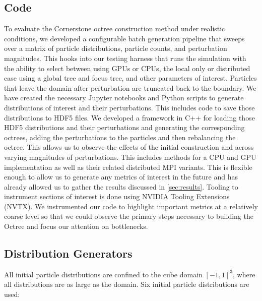\subsection{Code}
To evaluate the Cornerstone octree construction method under realistic conditions, we developed a configurable batch generation pipeline that sweeps over a matrix of particle distributions, particle counts, and perturbation magnitudes. This hooks into our testing harness that runs the simulation with the ability to select between using GPUs or CPUs, the local only or distributed case using a global tree and focus tree, and other parameters of interest. Particles that leave the domain after perturbation are truncated back to the boundary. We have created the necessary Jupyter notebooks and Python scripts to generate distributions of interest and their perturbations. This includes code to save those distributions to HDF5 files. We developed a framework in C++ for loading those HDF5 distributions and their perturbations and generating the corresponding octrees, adding the perturbations to the particles and then rebalancing the octree. This allows us to observe the effects of the initial construction and across varying magnitudes of perturbations. This includes methods for a CPU and GPU implementation as well as their related distributed MPI variants. This is flexible enough to allow us to generate any metrics of interest in the future and has already allowed us to gather the results discussed in \ref{sec:results}. Tooling to instrument sections of interest is done using NVIDIA Tooling Extensions (NVTX). We instrumented our code to highlight important metrics at a relatively coarse level so that we could observe the primary steps necessary to building the Octree and focus our attention on bottlenecks. 

\subsection{Distribution Generators}
All initial particle distributions are confined to the cube domain $[-1,1]^3$, where all distributions are as large as the domain.
Six initial particle distributions are used:


